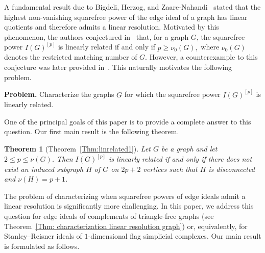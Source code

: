 \documentclass[12pt]{amsart}
\newtheorem{Theorem}{Theorem}[section]
\begin{document}
A fundamental result due to Bigdeli, Herzog, and Zaare-Nahandi~\cite[Theorem~5.1]{BHZ} stated that the highest non-vanishing squarefree power of the edge ideal of a graph has linear quotients and therefore admits a linear resolution. Motivated by this phenomenon, the authors conjectured in~\cite[Conjecture~5.3]{BHZ} that, for a graph $G$, the squarefree power $I(G)^{[p]}$ is linearly related if and only if $p \geq \nu_0(G),$ where $\nu_0(G)$ denotes the restricted matching number of $G$. %
However, a counterexample to this conjecture was later provided in~\cite[page~12]{EHHM}. This naturally motivates the following problem.

\medskip

\noindent
\textbf{Problem.}
Characterize the graphs $G$ for which the squarefree power $I(G)^{[p]}$ is linearly related.

\medskip

One of the principal goals of this paper is to provide a complete answer to this question. Our first main result is the following theorem.

\begin{Theorem}[Theorem~\ref{Thm:linrelated1}]
Let $G$ be a graph and let $2 \leq p \leq \nu(G)$. Then $I(G)^{[p]}$ is linearly related if and only if there does not exist an induced subgraph $H$ of $G$ on $2p+2$ vertices such that $H$ is disconnected and $\nu(H)=p+1$.
\end{Theorem}


The problem of characterizing when squarefree powers of edge ideals admit a linear resolution is significantly more challenging. In this paper, we address this question for edge ideals of complements of triangle-free graphs (see Theorem~\ref{Thm: characterization linear resolution graph}) or, equivalently, for Stanley--Reisner ideals of $1$-dimensional flag simplicial complexes. Our main result is formulated as follows.
\end{document}
